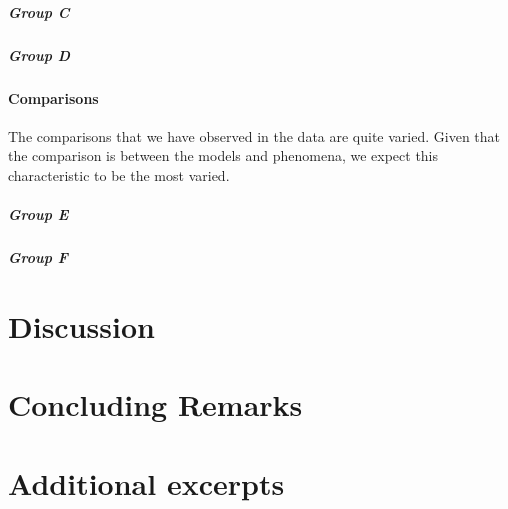 \documentclass{msuphddissertation}
\begin{document}
\begin{doublespace}
\paragraph{Group C}

\paragraph{Group D}

\subsubsection{Comparisons}

The comparisons that we have observed in the data are quite varied.  Given that the comparison is between the models and phenomena, we expect this characteristic to be the most varied.

\paragraph{Group E}

\paragraph{Group F}

%
%

\chapter{Discussion}

%
%

\chapter{Concluding Remarks}

%
%

\appendices

\chapter{Additional excerpts}

%
%

\end{doublespace}



\end{document}
